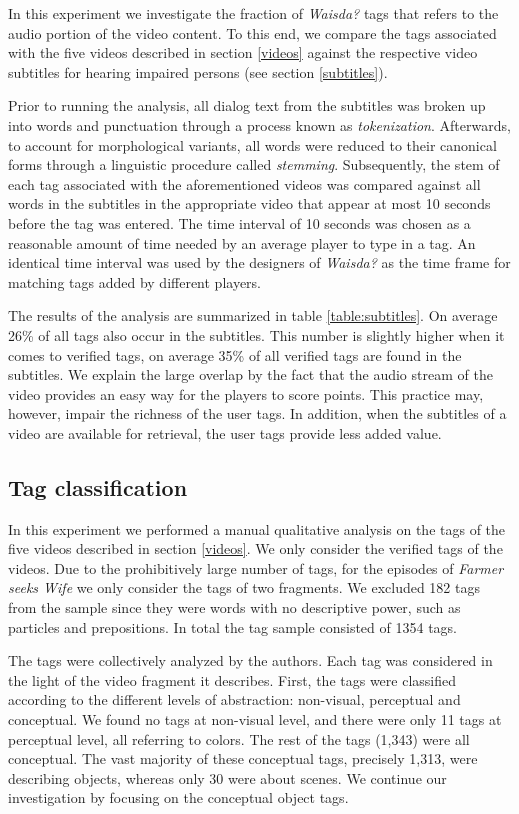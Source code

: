In this experiment we investigate the fraction of \emph{Waisda?} tags that refers to
the audio portion of the video content. To this end, we compare the tags
associated with the five videos described in section \ref{videos} against the
respective video subtitles for hearing impaired persons (see section
\ref{subtitles}). 

Prior to running the analysis, all dialog text from the subtitles was broken
up into words and punctuation through a process known as
\textit{tokenization}. Afterwards, to account for morphological variants, all
words were reduced to their canonical forms through a linguistic procedure
called \textit{stemming}. Subsequently, the stem of each tag associated with the
aforementioned videos was compared against all words in the subtitles in the
appropriate video that appear at most 10 seconds before the tag was entered.
The time interval of 10 seconds was chosen as a reasonable amount of time
needed by an average player to type in a tag. An identical time interval was
used by the designers of \emph{Waisda?} as the time frame for matching tags added by
different players.

The results of the analysis are summarized in table \ref{table:subtitles}. On
average 26\% of all tags also occur in the subtitles. This number is slightly
higher when it comes to verified tags, on average 35\% of all verified tags
are found in the subtitles. We explain the large overlap by the fact that the
audio stream of the video provides an easy way for the players to score
points. This practice may, however, impair the richness of the user tags. In
addition, when the subtitles of a video are available for retrieval, the user
tags provide less added value.

\subsection{Tag classification}

In this experiment we performed a manual qualitative analysis on the tags of
the five videos described in section \ref{videos}. We only consider the
verified tags of the videos. Due to the prohibitively large number of tags,
for the episodes of \emph{Farmer seeks Wife} we only consider the tags of two
fragments. We excluded 182 tags from the sample since they were words with no
descriptive power, such as particles and prepositions. In total the tag sample
consisted of 1354 tags.

The tags were collectively analyzed by the authors. Each tag was considered in
the light of the video fragment it describes. First, the tags were classified
according to the different levels of abstraction: non-visual, perceptual and
conceptual. We found no tags at non-visual level, and there were only 11 tags
at perceptual level, all referring to colors. The rest of the tags (1,343)
were all conceptual. The vast majority of these conceptual tags, precisely
1,313, were describing objects, whereas only 30 were about scenes. We continue
our investigation by focusing on the conceptual object tags.

